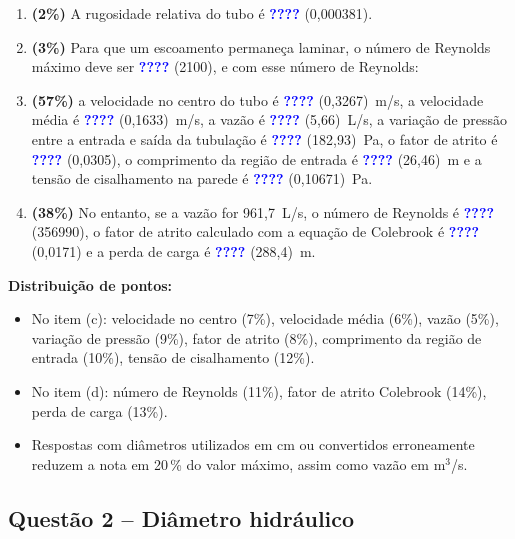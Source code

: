 \documentclass[11pt,a4paper]{article}
\newcommand{\resposta}[1]{\textbf{\textcolor{blue}{????}} \textcolor{gray!70!black}{(#1)}}
\begin{document}
\begin{enumerate}[label=(\alph*)]
    \item \textbf{(2\%)} A rugosidade relativa do tubo é \resposta{0,000381}.
    \item \textbf{(3\%)} Para que um escoamento permaneça laminar, o número de Reynolds máximo deve ser \resposta{2100}, e com esse número de Reynolds:
    \item \textbf{(57\%)} a velocidade no centro do tubo é \resposta{0,3267}~m/s, a velocidade média é \resposta{0,1633}~m/s, a vazão é \resposta{5,66}~L/s, a variação de pressão entre a entrada e saída da tubulação é \resposta{182,93}~Pa, o fator de atrito é \resposta{0,0305}, o comprimento da região de entrada é \resposta{26,46}~m e a tensão de cisalhamento na parede é \resposta{0,10671}~Pa.
    \item \textbf{(38\%)} No entanto, se a vazão for 961,7~L/s, o número de Reynolds é \resposta{356990}, o fator de atrito calculado com a equação de Colebrook é \resposta{0,0171} e a perda de carga é \resposta{288,4}~m.
\end{enumerate}

\textbf{Distribuição de pontos:}
\begin{itemize}
    \item No item (c): velocidade no centro (7\%), velocidade média (6\%), vazão (5\%), variação de pressão (9\%), fator de atrito (8\%), comprimento da região de entrada (10\%), tensão de cisalhamento (12\%).
    \item No item (d): número de Reynolds (11\%), fator de atrito Colebrook (14\%), perda de carga (13\%).
    \item Respostas com diâmetros utilizados em cm ou convertidos erroneamente reduzem a nota em 20\,\% do valor máximo, assim como vazão em m$^3$/s.
\end{itemize}

\noindent{}

\vspace{1.5em}

\subsection*{Questão 2 -- Diâmetro hidráulico}
\end{document}
